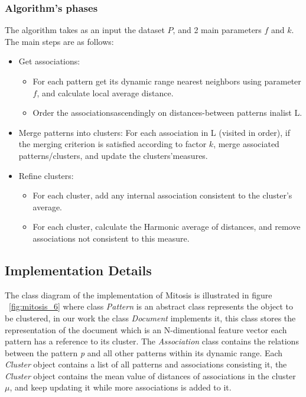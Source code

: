 \subsubsection{Algorithm's phases}\label{sec:phases}

The algorithm takes as an input the dataset $P$, and 2 main parameters $f$ and $k$. The main steps are as follows:
\begin{itemize}

\item {Get associations:
\begin{itemize}
	\item For each pattern get its dynamic range nearest neighbors using parameter $f$, and calculate local average distance.
	\item Order the associationsascendingly on distances-between patterns inalist L.
\end{itemize}
}


\item {Merge patterns into clusters: For each association in L (visited in order), if the merging criterion is satisfied according to factor $k$, merge
associated patterns/clusters, and update the clusters'measures.}
\item {Refine clusters:
\begin{itemize}
\item For each cluster, add any internal association consistent to the cluster's average.
\item For each cluster, calculate the Harmonic average of distances, and remove associations not consistent to this measure.
\end{itemize}
}
\end{itemize}


\subsection{Implementation Details}\label{sec:implementation}
The class diagram of the implementation of Mitosis is illustrated in figure ~\ref{fig:mitosis_6} where class \textit{Pattern} is an abstract class represents the object to be clustered, in our work the class \textit{Document} implements it, this class stores the representation of the document which is an N-dimentional feature vector each pattern has a reference to its cluster.
The \textit{Association} class contains the relations between the pattern \textit{p} and all other patterns within its dynamic range. Each \textit{Cluster} object contains a list of all patterns and associations consisting it, the \textit{Cluster} object contains the mean value of distances of associations in the cluster $\mu$, and keep updating it while more associations is added to it.

